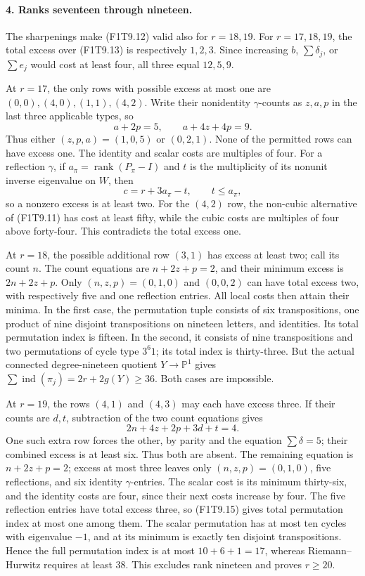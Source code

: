 \paragraph{4. Ranks seventeen through nineteen.}
The sharpenings make (F1T9.12) valid also for \(r=18,19\).
For \(r=17,18,19\), the total excess over (F1T9.13) is
respectively \(1,2,3\). Since increasing \(b\), \(\sum\delta_j\),
or \(\sum e_j\) would cost at least four, all three equal
\(12,5,9\).

At \(r=17\), the only rows with possible excess at most one
are \((0,0),(4,0),(1,1),(4,2)\). Write their nonidentity
\(\gamma\)-counts as \(z,a,p\) in the last three applicable
types, so
\[
                    a+2p=5,\qquad a+4z+4p=9.
 \tag{F1T9.14}
\]
Thus either \((z,p,a)=(1,0,5)\) or \((0,2,1)\).
None of the permitted rows can have excess one. The identity
and scalar costs are multiples of four. For a reflection
\(\gamma\), if \(a_\pi=\operatorname{rank}(P_\pi-I)\) and
\(t\) is the multiplicity of its nonunit inverse eigenvalue
on \(W\), then
\[
                         c=r+3a_\pi-t,\qquad t\le a_\pi,
 \tag{F1T9.15}
\]
so a nonzero excess is at least two. For the \((4,2)\) row,
the non-cubic alternative of (F1T9.11) has cost at least
fifty, while the cubic costs are multiples of four above
forty-four. This contradicts the total excess one.

At \(r=18\), the possible additional row \((3,1)\) has
excess at least two; call its count \(n\). The count equations
are \(n+2z+p=2\), and their minimum excess is
\(2n+2z+p\). Only \((n,z,p)=(0,1,0)\) and \((0,0,2)\)
can have total excess two, with respectively five and one
reflection entries. All local costs then attain their minima.
In the first case, the permutation tuple consists of six
transpositions, one product of nine disjoint transpositions
on nineteen letters, and identities. Its total permutation
index is fifteen. In the second, it consists of nine
transpositions and two permutations of cycle type \(3^6 1\);
its total index is thirty-three. But the actual connected
degree-nineteen quotient \(Y\to\mathbb P^1\) gives
\(\sum\operatorname{ind}(\pi_j)=2r+2g(Y)\ge36\).
Both cases are impossible.

At \(r=19\), the rows \((4,1)\) and \((4,3)\) may each
have excess three. If their counts are \(d,t\), subtraction
of the two count equations gives
\[
                         2n+4z+2p+3d+t=4.
\]
One such extra row forces the other, by parity and the
equation \(\sum\delta=5\); their combined excess is at least
six. Thus both are absent. The remaining equation is
\(n+2z+p=2\); excess at most three leaves only
\((n,z,p)=(0,1,0)\), five reflections, and six identity
\(\gamma\)-entries. The scalar cost is its minimum thirty-six,
and the identity costs are four, since their next costs
increase by four. The five reflection entries have total
excess three, so (F1T9.15) gives total permutation index at
most one among them. The scalar permutation has at most ten
cycles with eigenvalue \(-1\), and at its minimum is exactly
ten disjoint transpositions. Hence the full permutation
index is at most \(10+6+1=17\), whereas Riemann--Hurwitz
requires at least \(38\). This excludes rank nineteen and
proves \(r\ge20\).

